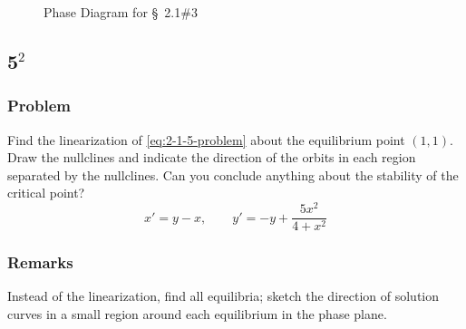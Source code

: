 \documentclass[12pt]{article}
\begin{document}
\begin{figure}
  \centering
  \label{fig:3-phase-diagram}
  \caption{Phase Diagram for \S~2.1\#3}
\end{figure}

\newpage
\subsection{5$^2$}
\subsubsection*{Problem}
Find the linearization of \cref{eq:2-1-5-problem} about the equilibrium point
$(1,1)$. Draw the nullclines and indicate the direction of the orbits in each
region separated by the nullclines. Can you conclude anything about the
stability of the critical point?
\begin{equation}
  \label{eq:2-1-5-problem}
  x'=y-x, \qquad y'=-y+\frac{5x^2}{4+x^2}
\end{equation}
\subsubsection*{Remarks}
Instead of the linearization, find all equilibria; sketch the direction of
solution curves in a small region around each equilibrium in the phase plane.
\end{document}
